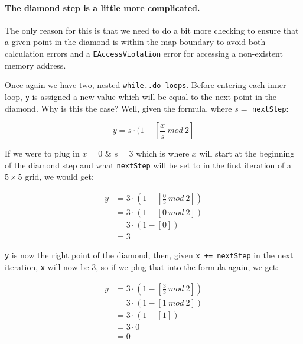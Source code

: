 \documentclass{article}
\begin{document}
\restoregeometry

\paragraph{The diamond step is a little more complicated.} The only reason for this is that we need to do a bit more checking to ensure that a given point in the diamond is within the map boundary to avoid both calculation errors and a \texttt{EAccessViolation} error for accessing a non-existent memory address.

Once again we have two, nested \texttt{while..do loops}. Before entering each inner loop, \texttt{y} is assigned a new value which will be equal to the next point in the diamond. Why is this the case? Well, given the formula, where $s=$ \texttt{nextStep}:

\begin{equation}
y=s \cdot (1 - \left[\frac{x}{s} \ mod \ 2\right]
\end{equation}

If we were to plug in $x=0$ \& $s=3$ which is where $x$ will start at the beginning of the diamond step and what \texttt{nextStep} will be set to in the first iteration of a $5 \times 5$ grid, we would get:

\begin{equation}
\begin{split}
y&=3 \cdot (1 - \left[\frac{0}{3} \ mod \ 2\right]) \\
&=3 \cdot (1 - \left[0 \ mod \ 2\right]) \\
&=3 \cdot (1 - [0]) \\
&=3
\end{split}
\end{equation}

\texttt{y} is now the right point of the diamond, then, given \texttt{x += nextStep} in the next iteration, \texttt{x} will now be $3$, so if we plug that into the formula again, we get:

\begin{equation}
\begin{split}
y&=3 \cdot (1 - \left[\frac{3}{3} \ mod \ 2\right]) \\
&=3 \cdot (1 - \left[1 \ mod \ 2\right]) \\
&=3 \cdot (1 - [1]) \\
&=3 \cdot 0 \\
&=0
\end{split}
\end{equation}
\end{document}
